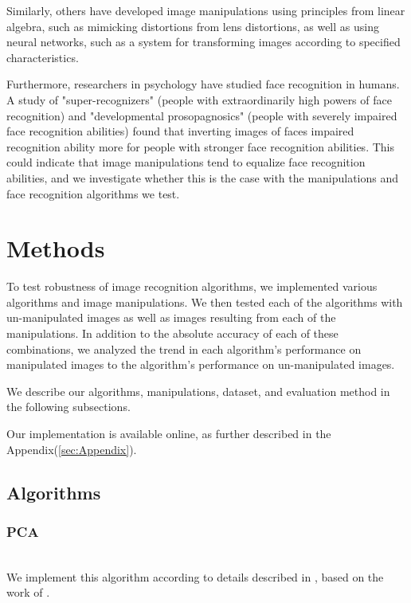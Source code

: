 \documentclass[pageno]{cos429}
\begin{document}
Similarly, others have developed image manipulations using principles from linear algebra, such as mimicking distortions from lens distortions, as well as using neural networks, such as a system for transforming images according to specified characteristics\cite{savarese_camera_2015}\cite{upchurch_deep_2016}.

Furthermore, researchers in psychology have studied face recognition in humans. A study of "super-recognizers" (people with extraordinarily high powers of face recognition) and "developmental prosopagnosics" (people with severely impaired face recognition abilities) found that inverting images of faces impaired recognition ability more for people with stronger face recognition abilities\cite{russell_super-recognizers:_2009}. This could indicate that image manipulations tend to equalize face recognition abilities, and we investigate whether this is the case with the manipulations and face recognition algorithms we test.

\section{Methods}
To test robustness of image recognition algorithms, we implemented various algorithms and image manipulations. We then tested each of the algorithms with un-manipulated images as well as images resulting from each of the manipulations. In addition to the absolute accuracy of each of these combinations, we analyzed the trend in each algorithm's performance on manipulated images to the algorithm's performance on un-manipulated images.

We describe our algorithms, manipulations, dataset, and evaluation method in the following subsections.

Our implementation is available online, as further described in the Appendix(\ref{sec:Appendix}).

\subsection{Algorithms}
\subsubsection{PCA}\hspace*{\fill} \\
We implement this algorithm according to details described in \cite{vidal_eigenfaces_2008}, based on the work of \cite{turk_eigenfaces_1991}.
\end{document}
